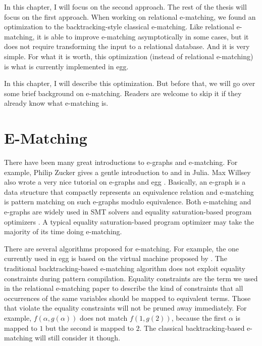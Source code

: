 In this chapter,
 I will focus on the second approach.
The rest of the thesis will focus on the first approach.
When working on relational e-matching, 
 we found an optimization to the backtracking-style classical e-matching.
Like relational e-matching, 
 it is able to improve e-matching asymptotically in some cases, 
 but it does not require transforming the input \egraph to a relational database.
And it is very simple.
For what it is worth, 
 this optimization (instead of relational e-matching) is what is currently
 implemented in egg.

In this chapter, I will describe this optimization.
But before that,
 we will go over some brief background on e-matching.
Readers are welcome to skip it if they already know what e-matching is.

\section{E-Matching}\label{e-matching}

There have been many great introductions to e-graphs and e-matching.
For example, 
 Philip Zucker gives
 a gentle introduction to 
 \egraphs \citep{zucker-egraph-1} and
 \ematching \citep{zucker-egraph-2} in Julia.
Max Willsey also wrote a very nice tutorial \citep{egg-tutorial}
 on e-graphs and egg \citep{egg}.
Basically, 
 an e-graph is a data structure that compactly represents 
 an equivalence relation and 
 e-matching is pattern matching
 on such e-graphs modulo equivalence.
Both e-matching and e-graphs are widely used in
 SMT solvers \citep{efficient-ematching}
 and equality saturation-based
 program optimizers \citep{tensat}.
A typical equality saturation-based program optimizer may
 take the majority of its time doing e-matching.

There are several algorithms proposed for e-matching.
For example,
 the one currently used in egg is based
 on the virtual machine proposed by \citet{efficient-ematching}.
The traditional backtracking-based e-matching algorithm
 does not exploit equality constraints during pattern compilation.
Equality constraints are the term we used in the relational e-matching paper
 to describe the kind of constraints that all occurrences of the same variables should be mapped
 to equivalent terms.
Those that violate the equality constraints will
 not be pruned away immediately.
For example, \(f(\alpha, g(\alpha))\)
 does not match \(f(1,g(2))\), 
 because the first \(\alpha\) is mapped to
 $1$ but the second is mapped to $2$.
The classical backtracking-based
 e-matching will still consider it though.

